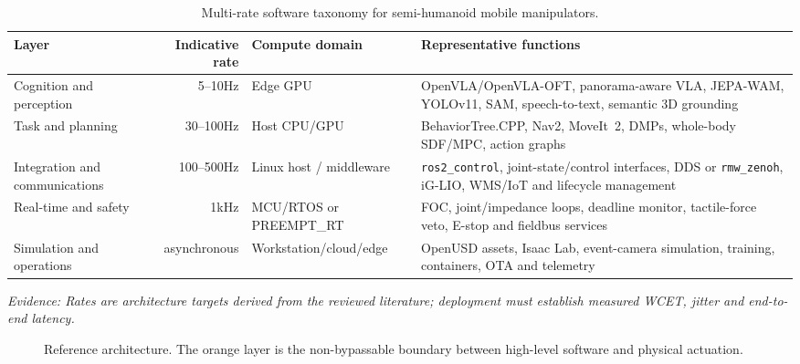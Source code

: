 \documentclass[10pt,a4paper]{article}
\newcommand{\evidence}[1]{\par\noindent\footnotesize\color{gray}\emph{Evidence: #1}\normalsize\par}
\begin{document}
\begin{table}[ht]
\centering\small
\caption{Multi-rate software taxonomy for semi-humanoid mobile manipulators.}\label{tab:rates}
\begin{tabularx}{\textwidth}{@{}lrlY@{}}
\toprule
Layer & Indicative rate & Compute domain & Representative functions \\
\midrule
Cognition and perception & 5--10Hz & Edge GPU & OpenVLA/OpenVLA-OFT, panorama-aware VLA, JEPA-WAM, YOLOv11, SAM, speech-to-text, semantic 3D grounding \\
Task and planning & 30--100Hz & Host CPU/GPU & BehaviorTree.CPP, Nav2, MoveIt~2, DMPs, whole-body SDF/MPC, action graphs \\
Integration and communications & 100--500Hz & Linux host / middleware & \texttt{ros2\_control}, joint-state/control interfaces, DDS or \texttt{rmw\_zenoh}, iG-LIO, WMS/IoT and lifecycle management \\
Real-time and safety & 1kHz & MCU/RTOS or PREEMPT\_RT & FOC, joint/impedance loops, deadline monitor, tactile-force veto, E-stop and fieldbus services \\
Simulation and operations & asynchronous & Workstation/cloud/edge & OpenUSD assets, Isaac Lab, event-camera simulation, training, containers, OTA and telemetry \\
\bottomrule
\end{tabularx}
\evidence{Rates are architecture targets derived from the reviewed literature; deployment must establish measured WCET, jitter and end-to-end latency.}
\end{table}

\begin{figure}[ht]
\centering
{}
\caption{Reference architecture. The orange layer is the non-bypassable boundary between high-level software and physical actuation.}
\label{fig:stack}
\end{figure}
\end{document}
